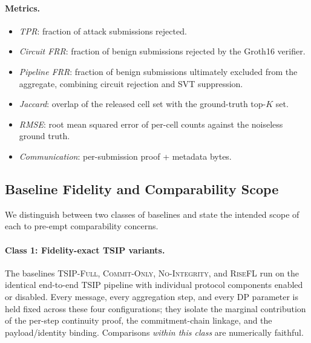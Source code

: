 \documentclass[conference]{IEEEtran}
\theoremstyle{definition}
\theoremstyle{plain}
\begin{document}
\paragraph{Metrics.}
\begin{itemize}
    \item \emph{TPR}: fraction of attack submissions rejected.
    \item \emph{Circuit FRR}: fraction of benign submissions rejected by the Groth16 verifier.
    \item \emph{Pipeline FRR}: fraction of benign submissions ultimately excluded from the aggregate, combining circuit rejection and SVT suppression.
    \item \emph{Jaccard}: overlap of the released cell set with the ground-truth top-$K$ set.
    \item \emph{RMSE}: root mean squared error of per-cell counts against the noiseless ground truth.
    \item \emph{Communication}: per-submission proof + metadata bytes.
\end{itemize}

\subsection{Baseline Fidelity and Comparability Scope}
\label{sec:eval-fidelity}

We distinguish between two classes of baselines and state the intended
scope of each to pre-empt comparability concerns.

\paragraph{Class 1: Fidelity-exact TSIP variants.}
The baselines \textsc{TSIP-Full}, \textsc{Commit-Only}, \textsc{No-Integrity},
and \textsc{RiseFL} run on the identical end-to-end TSIP pipeline with
individual protocol components enabled or disabled.
Every message, every aggregation step, and every DP parameter is held fixed
across these four configurations; they isolate the marginal contribution
of the per-step continuity proof, the commitment-chain linkage, and the
payload/identity binding. Comparisons \emph{within this class}
are numerically faithful.
\end{document}
